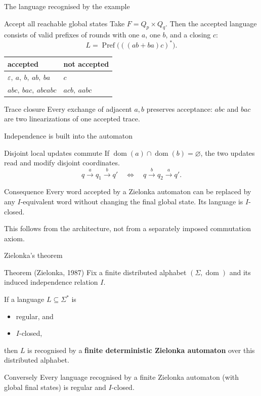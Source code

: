 \documentclass[t,11pt]{beamer}
\newcommand{\domn}{\operatorname{dom}}
\newcommand{\Pref}{\operatorname{Pref}}
\begin{document}
\begin{frame}{The language recognised by the example}
  \begin{block}{Accept all reachable global states}
    Take $F=Q_p\times Q_q$. Then the accepted language consists of valid prefixes of rounds with one $a$, one $b$, and a closing $c$:
    \[
       L=\Pref\bigl(((ab+ba)c)^*\bigr).
    \]
  \end{block}
  \begin{center}
  \begin{tabular}{l|l}
    accepted & not accepted\\ \hline
    $\varepsilon,\ a,\ b,\ ab,\ ba$ & $c$\\
    $abc,\ bac,\ abcabc$ & $acb,\ aabc$
  \end{tabular}
  \end{center}
  \begin{block}{Trace closure}
    Every exchange of adjacent $a,b$ preserves acceptance: $abc$ and $bac$ are two linearizations of one accepted trace.
  \end{block}
\end{frame}

\begin{frame}{Independence is built into the automaton}
  \begin{block}{Disjoint local updates commute}
    If $\domn(a)\cap\domn(b)=\varnothing$, the two updates read and modify disjoint coordinates.
    \[
       q\xrightarrow{a}q_1\xrightarrow{b}q'
       \quad\Longleftrightarrow\quad
       q\xrightarrow{b}q_2\xrightarrow{a}q'.
    \]
  \end{block}
  \begin{block}{Consequence}
    Every word accepted by a Zielonka automaton can be replaced by any $I$-equivalent word without changing the final global state. Its language is $I$-closed.
  \end{block}
  \vspace{0.15cm}
  This follows from the architecture, not from a separately imposed commutation axiom.
\end{frame}

\begin{frame}{Zielonka's theorem}
  \begin{block}{Theorem (Zielonka, 1987)}
    Fix a finite distributed alphabet $(\Sigma,\domn)$ and its induced independence relation $I$.

    If a language $L\subseteq\Sigma^*$ is
    \begin{itemize}
      \item regular, and
      \item $I$-closed,
    \end{itemize}
    then $L$ is recognised by a \textbf{finite deterministic Zielonka automaton} over this distributed alphabet.
  \end{block}
  \begin{block}{Conversely}
    Every language recognised by a finite Zielonka automaton (with global final states) is regular and $I$-closed.
  \end{block}
\end{frame}
\end{document}
